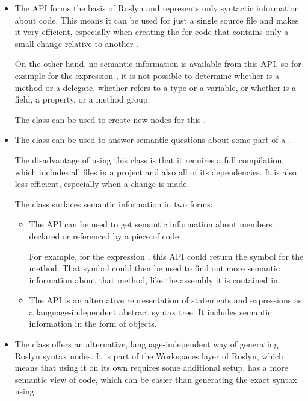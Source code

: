\begin{itemize}
\item The  \ac{API} forms the basis of Roslyn and represents only syntactic information about code. This means it can be used for just a single source file and makes it very efficient, especially when creating the  for code that contains only a small change relative to another .

On the other hand, no semantic information is available from this \ac{API}, so for example for the expression , it is not possible to determine whether  is a method or a delegate, whether  refers to a type or a variable, or whether  is a field, a property, or a method group.

The  class can be used to create new nodes for this .

\item The  class can be used to answer semantic questions about some part of a .

The disadvantage of using this class is that it requires a full compilation, which includes all files in a project and also all of its dependencies. It is also less efficient, especially when a change is made.

The  class surfaces semantic information in two forms:

\begin{itemize}
\item The  \ac{API} can be used to get semantic information about members declared or referenced by a piece of code.

For example, for the expression , this \ac{API} could return the symbol for the  method. That symbol could then be used to find out more semantic information about that method, like the assembly it is contained in.

\item The  \ac{API} is an alternative representation of statements and expressions as a language-independent abstract syntax tree. It includes semantic information in the form of  objects.

\end{itemize}

\item The  class offers an alternative, language-independent way of generating Roslyn syntax nodes. It is part of the Workspaces layer of Roslyn, which means that using it on its own requires some additional setup.  has a more semantic view of code, which can be easier than generating the exact syntax using .


\end{itemize}
